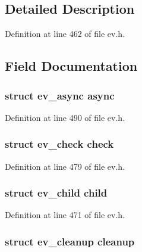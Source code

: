 \subsection{\-Detailed \-Description}


\-Definition at line 462 of file ev.\-h.



\subsection{\-Field \-Documentation}
\hypertarget{unionev__any__watcher_a56b1e7af8c270020043037a796260aa1}{
\subsubsection[{async}]{\setlength{\rightskip}{0pt plus 5cm}struct {\bf ev\-\_\-async} {\bf async}}}\label{unionev__any__watcher_a56b1e7af8c270020043037a796260aa1}


\-Definition at line 490 of file ev.\-h.

\hypertarget{unionev__any__watcher_a2b3de3d8f728c8ee5a2fc71499a6c4ea}{
\subsubsection[{check}]{\setlength{\rightskip}{0pt plus 5cm}struct {\bf ev\-\_\-check} {\bf check}}}\label{unionev__any__watcher_a2b3de3d8f728c8ee5a2fc71499a6c4ea}


\-Definition at line 479 of file ev.\-h.

\hypertarget{unionev__any__watcher_ae1125f192c1eb184294efd761ed9b7de}{
\subsubsection[{child}]{\setlength{\rightskip}{0pt plus 5cm}struct {\bf ev\-\_\-child} {\bf child}}}\label{unionev__any__watcher_ae1125f192c1eb184294efd761ed9b7de}


\-Definition at line 471 of file ev.\-h.

\hypertarget{unionev__any__watcher_aeafce63f71f8dceb78babad901832f01}{
\subsubsection[{cleanup}]{\setlength{\rightskip}{0pt plus 5cm}struct {\bf ev\-\_\-cleanup} {\bf cleanup}}}\label{unionev__any__watcher_aeafce63f71f8dceb78babad901832f01}


